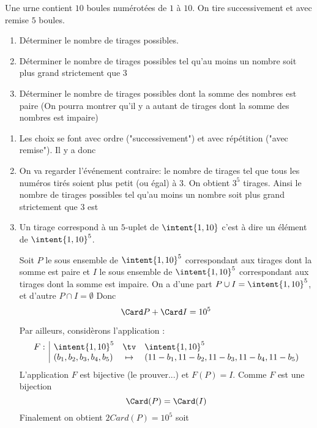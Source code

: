 \documentclass[a4paper, 11pt,reqno]{article}
\begin{document}
\begin{exercice}   \;
Une urne contient  $10$ boules numérotées de $1$ à $10$. On tire successivement et avec remise $5$ boules.
\begin{enumerate}
\item Déterminer le nombre de tirages possibles. 
\item Déterminer le nombre de tirages possibles tel qu'au moins un nombre soit plus grand strictement que $3$ 
\item Déterminer le nombre de tirages possibles dont la somme des nombres est paire (On pourra montrer qu'il y a autant de tirages dont la somme des nombres est impaire)
\end{enumerate}
\end{exercice}

\begin{correction}
\begin{enumerate}
\item Les choix se font avec ordre ("successivement") et avec répétition ("avec  remise"). Il y a donc 
\item On va regarder l'événement contraire: le nombre de tirages tel que tous les numéros tirés soient plus petit (ou égal) à $3$. On obtient $3^5$ tirages. 
Ainsi le nombre de tirages possibles tel qu'au moins un nombre soit plus grand strictement que $3$ est 
\item Un tirage correspond à un $5$-uplet de $\intent{1,10}$ c'est à dire un élément de $\intent{ 1,10}^5$. 

Soit $P$ le sous ensemble de $\intent{ 1,10}^5$ correspondant aux tirages dont la somme est paire et $I$  le sous ensemble de $\intent{ 1,10}^5$ correspondant aux tirages dont la somme est impaire.
On a d'une part $P\cup I = \intent{ 1,10}^5$, et d'autre $P\cap I =\emptyset$
Donc $$\Card P + \Card I =10^5$$

Par ailleurs, considèrons l'application : 
$$\begin{array}{c|lcl}
F :& \intent{ 1,10}^5 &\tv& \intent{ 1,10}^5\\
& (b_1,b_2,b_3,b_4,b_5) &\mapsto &(11-b_1,11-b_2,11-b_3,11-b_4,11-b_5)
\end{array}$$
L'application $F$ est bijective (le prouver...) et $F(P) = I$. Comme $F$ est une bijection 
$$\Card(P) = \Card(I)$$ 
Finalement on obtient 
$2 Card(P) = 10^5$ soit 






\end{enumerate}
\end{correction}
\end{document}
